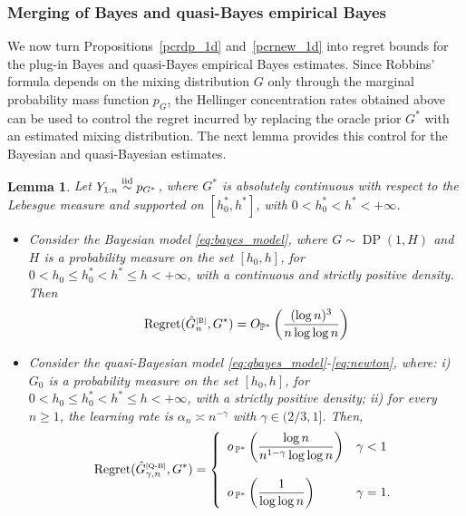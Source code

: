 \documentclass[twoside,12pt]{article}
\def\simiid{\stackrel{\mbox{\scriptsize{iid}}}{\sim}}
\newtheorem{lem}[thm]{Lemma}
\begin{document}
\subsubsection{Merging of Bayes and quasi-Bayes empirical Bayes}

We now turn Propositions~\ref{pcrdp_1d} and~\ref{pcrnew_1d} into regret bounds for the plug-in Bayes and quasi-Bayes empirical Bayes estimates. Since Robbins' formula depends on the mixing distribution $G$ only through the marginal probability mass function $p_{G}$, the Hellinger concentration rates obtained above can be used to control the regret incurred by replacing the oracle prior $G^\ast$ with an estimated mixing distribution. The next lemma provides this control for the Bayesian and quasi-Bayesian estimates.

\begin{lem}\label{lemma:Jana}
Let $Y_{1:n}\simiid p_{G^\ast}$, where $G^\ast$ is absolutely continuous with respect to the Lebesgue measure and supported on $[h_0^\ast,h^\ast]$, with $0<h_0^\ast<h^\ast<+\infty$.  
\begin{itemize}
    \item[a)]  Consider the Bayesian model \eqref{eq:bayes_model}, where $G\sim \operatorname{DP}(1,H)$ and $H$ is a probability measure on the set $[h_{0},h]$, for $0<h_{0}\leq h_{0}^{\ast}<h^{\ast}\leq h<+\infty$, with a continuous and strictly positive density. Then 
\begin{align*}
\mathrm{Regret}(\hat G_{n}^{\text{\tiny{[B]}}},G^*)=O_{\mathbb P^\ast}\left(\frac{(\log n)^3}{n\log\log n}\right)
\end{align*}
\item[b)] Consider the quasi-Bayesian model \eqref{eq:qbayes_model}-\eqref{eq:newton}, where: i) $G_0$ is a probability measure on the set $[h_0,h]$, for $0<h_0\leq h_0^\ast<h^\ast\leq h<+\infty$, with a strictly positive density; ii)  for every $n\geq 1$, the learning rate is $\alpha_n\asymp n^{-\gamma}$ with $\gamma\in(2/3,1]$. Then,
\begin{align}\label{eq:regret_rate_qb_1d}
\mathrm{Regret}(\hat G_{\gamma,n}^{\text{\tiny{[Q-B]}}},G^*)=
\left\{
\begin{array}{ll}
o_{\,\mathbb{P}^{\ast}}\left(\dfrac{\log n}{n^{1-\gamma}\log\log n}\right)&\gamma <1\\
\\
o_{\,\mathbb{P}^{\ast}}\left(\dfrac{1}{\log\log n}\right)&\gamma =1.
\end{array}
\right.
\end{align}
\end{itemize}
\end{lem}
\end{document}

